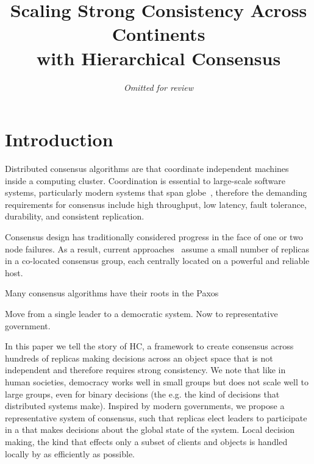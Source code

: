 \documentclass[10pt,twocolumn]{article}
\begin{document}
\title{\bf Scaling Strong Consistency Across Continents\\
with Hierarchical Consensus}
\author{\emph{Omitted for review}}
\date{}

\maketitle

\thispagestyle{empty}

\begin{abstract}
    
\end{abstract}

\section*{Introduction}

Distributed consensus algorithms are  that
coordinate independent machines inside a computing cluster.
Coordination is essential to large-scale software systems, particularly
modern systems that span globe~\cite{spanner,}, therefore the demanding requirements for
consensus include high throughput, low latency, fault tolerance, durability,
and consistent replication.



Consensus design has traditionally considered progress in the face of one or
two node failures.
As a result, current
approaches~\cite{mencius,epaxos,multicoordinated_paxos,spaxos,mdcc}
assume a small number of replicas in a co-located consensus group, each
centrally located on a powerful and reliable host.

Many consensus algorithms have their roots in the Paxos~\cite{paxos}

Move from a single leader to a democratic system. Now to representative government. 

In this paper we tell the story of HC, a framework to create consensus across
hundreds of replicas making decisions across an object space that is not
independent and therefore requires strong consistency.
We note that like in human societies, democracy works well in small groups
but does not scale well to large groups, even for binary decisions (the e.g.
the kind of decisions that distributed systems make).
Inspired by modern governments, we propose a representative system of
consensus, such that replicas elect leaders to participate in a \roo that
makes decisions about the global state of the system.
Local decision making, the kind that effects only a subset of clients and
objects is handled locally by \subs as efficiently as possible.
\end{document}

